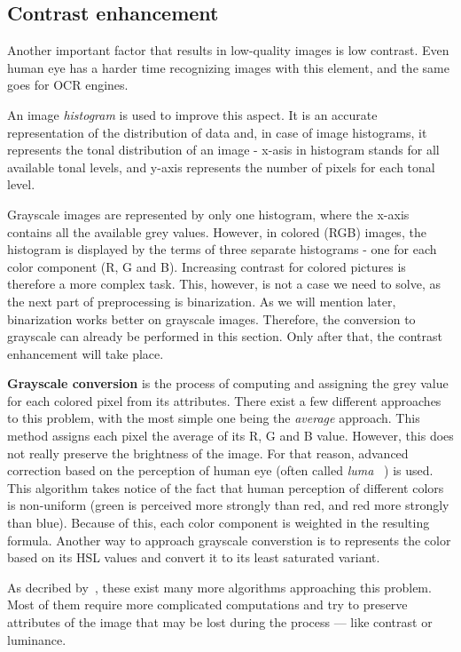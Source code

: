 \subsection{Contrast enhancement}

Another important factor that results in low-quality images is low contrast. Even human eye has a harder time recognizing images 
with this element, and the same goes for OCR engines. 

An image \emph{histogram} is used to improve this aspect. It is an accurate representation of the distribution of data and, in case of image histograms, it represents the tonal distribution of an image - x-asis in histogram stands for all available tonal levels, and y-axis represents the number of pixels for each tonal level.

Grayscale images are represented by only one histogram, where the x-axis contains all the available grey values. However, in colored (RGB) images, the histogram is displayed by the terms of three separate histograms - one for each color component (R, G and B). Increasing contrast for colored pictures is therefore a more complex task. This, however, is not a case we need to solve, as the next part of preprocessing is binarization. As we will mention later, binarization works better on grayscale images. Therefore, the conversion to grayscale can already be performed in this section. Only after that, the contrast enhancement will take place.

\textbf{Grayscale conversion} is the process of computing and assigning the grey value for each colored pixel from its attributes. There exist a few different approaches to this problem, with the most simple one being the \emph{average} approach. This method assigns each pixel the average of its R, G and B value. However, this does not really preserve the brightness of the image. For that reason, advanced correction based on the perception of human eye (often called \emph{luma}~\cite{grayscaleConv} ) is used. This algorithm takes notice of the fact that human perception of different colors is non-uniform (green is perceived more strongly than red, and red more strongly than blue). Because of this, each color component is weighted in the resulting formula. Another way to approach grayscale converstion is to represents the color based on its HSL values and convert it to its least saturated variant.

As decribed by~\citet{grayscaleCadik}, these exist many more algorithms approaching this problem. Most of them require more complicated computations and try to preserve attributes of the image that may be lost during the process --- like contrast or luminance.

